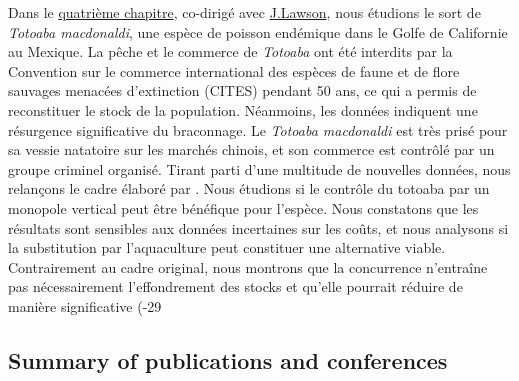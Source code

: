 \begin{displayquote}
\begin{displayquote}
\begin{displayquote}
{{{Dans le \hyperref[chapitre4]{quatrième chapitre}, co-dirigé avec \href{https://www.juliamlawson.com/}{J.Lawson}, nous étudions le sort de \textit{Totoaba macdonaldi}, une espèce de poisson endémique dans le Golfe de Californie au Mexique. La pêche et le commerce de \textit{Totoaba} ont été interdits par la Convention sur le commerce international des espèces de faune et de flore sauvages menacées d'extinction (CITES) pendant 50 ans, ce qui a permis de reconstituer le stock de la population. Néanmoins, les données indiquent une résurgence significative du braconnage. Le \textit{Totoaba macdonaldi} est très prisé pour sa vessie natatoire sur les marchés chinois, et son commerce est contrôlé par un groupe criminel organisé. Tirant parti d'une multitude de nouvelles données, nous relançons le cadre élaboré par \cite{damania_economics_2007}. Nous étudions si le contrôle du totoaba par un monopole vertical peut être bénéfique pour l'espèce. Nous constatons que les résultats sont sensibles aux données incertaines sur les coûts, et nous analysons si la substitution par l'aquaculture peut constituer une alternative viable. Contrairement au cadre original, nous montrons que la concurrence n'entraîne pas nécessairement l'effondrement des stocks et qu'elle pourrait réduire de manière significative (-29%

\clearpage

{}
\subsection*{Summary of publications and conferences}


\singlespacing

}}}
\end{displayquote}
\end{displayquote}
\end{displayquote}
